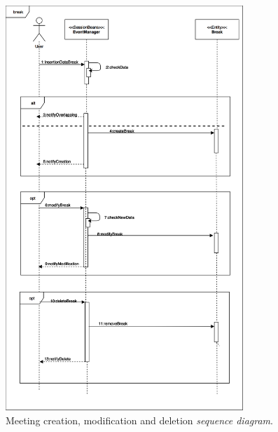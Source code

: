 \documentclass{article}
\begin{document}
	\begin{figure}[!ht]
	\centering
	\includegraphics[width=0.8\textwidth]{img/diagrams/sd_meeting.png}
	\caption{Meeting creation, modification and deletion \textit{sequence diagram}.}
	\end{figure}
\end{document}
